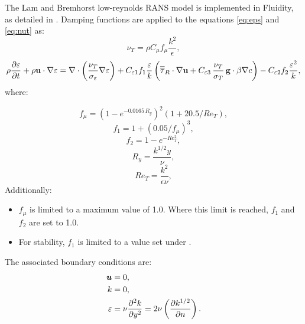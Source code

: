 The Lam and Bremhorst low-reynolds RANS model is implemented in Fluidity, as detailed in \citet{wilcox1998turbulence}. Damping functions are applied to the equations \ref{eq:eps} and \ref{eq:nut} as:
\begin{equation}\label{eq:nut_lowRe}
 \nu_T = \rho C_\mu f_\mu \frac{k^2}{\epsilon},
\end{equation}
\begin{equation}\label{eq:eps_lowRe}
\rho\frac{\partial \epsilon}{\partial t} + \rho\mathbf{u}\cdot\nabla \epsilon = \nabla\cdot\left(\frac{\nu_T}{\sigma_\epsilon} \nabla{\epsilon} \right) + C_{\epsilon1} f_1 \frac{\epsilon}{k} \left( \tautens_R \cdot \nabla\mathbf{u} + C_{\epsilon3} \, \frac{\nu_T}{\sigma_T} \, \mathbf{g}\cdot \beta \nabla c \right)- C_{\epsilon2} f_2 \frac{\epsilon^2}{k},
\end{equation}
where:

\begin{equation}\label{eq:f_mu}
 f_\mu = \left( 1 - e^{-0.0165 \, R_y} \right)^2 \left( 1 + 20.5/Re_T \right),
\end{equation}
\begin{equation}\label{eq:f_1}
 f_1 = 1 + \left( 0.05/f_\mu \right)^3,
\end{equation}
\begin{equation}\label{eq:f_2}
 f_2 = 1 - e^{-Re_T^2},
\end{equation}
\begin{equation}\label{eq:R_y}
 R_y = \frac{k^{1/2}y}{\nu},
\end{equation}
\begin{equation}\label{eq:Re_T}
 Re_T = \frac{k^2}{\epsilon \nu},
\end{equation}
Additionally:
\begin{itemize}
\item $f_\mu$ is limited to a maximum value of 1.0. Where this limit is reached, $f_1$ and $f_2$ are set to 1.0.
\item For stability, $f_1$ is limited to a value set under .
\end{itemize}

The associated boundary conditions are:
\begin{align}
\bmu &= 0, \label{eq:ubc1}\\
k &= 0, \label{eq:kbc1}\\
\epsilon &= \nu \ppxx[y]{k} = 2 \nu \left ( \ppx[n]{k^{1/2}} \right ). \label{eq:epsbc1}
\end{align}

